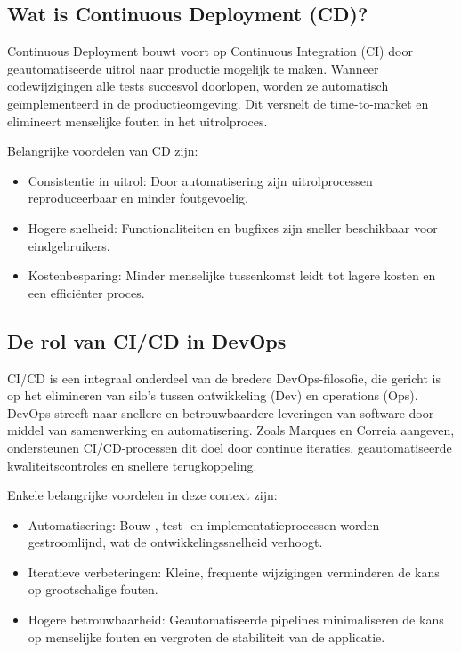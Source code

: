 \subsection{Wat is Continuous Deployment (CD)?}
Continuous Deployment bouwt voort op Continuous Integration (CI) door geautomatiseerde uitrol naar productie mogelijk te maken. Wanneer codewijzigingen alle tests succesvol doorlopen, worden ze automatisch geïmplementeerd in de productieomgeving. Dit versnelt de time-to-market en elimineert menselijke fouten in het uitrolproces. \autocite{Learn2024}

Belangrijke voordelen van CD zijn:

\begin{itemize}
    \item Consistentie in uitrol: Door automatisering zijn uitrolprocessen reproduceerbaar en minder foutgevoelig.
    \item Hogere snelheid: Functionaliteiten en bugfixes zijn sneller beschikbaar voor eindgebruikers.
    \item Kostenbesparing: Minder menselijke tussenkomst leidt tot lagere kosten en een efficiënter proces.
\end{itemize}

\subsection{De rol van CI/CD in DevOps}
CI/CD is een integraal onderdeel van de bredere DevOps-filosofie, die gericht is op het elimineren van silo's tussen ontwikkeling (Dev) en operations (Ops). DevOps streeft naar snellere en betrouwbaardere leveringen van software door middel van samenwerking en automatisering. Zoals Marques en Correia \autocite{marques2023} aangeven, ondersteunen CI/CD-processen dit doel door continue iteraties, geautomatiseerde kwaliteitscontroles en snellere terugkoppeling.

Enkele belangrijke voordelen in deze context zijn:
\begin{itemize}
    \item Automatisering: Bouw-, test- en implementatieprocessen worden gestroomlijnd, wat de ontwikkelingssnelheid verhoogt.
    \item Iteratieve verbeteringen: Kleine, frequente wijzigingen verminderen de kans op grootschalige fouten.
    \item Hogere betrouwbaarheid: Geautomatiseerde pipelines minimaliseren de kans op menselijke fouten en vergroten de stabiliteit van de applicatie.
\end{itemize}


